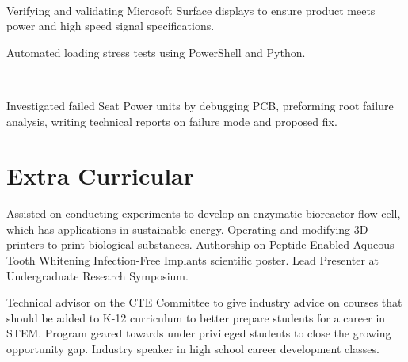 \documentclass[]{hieudo-build}
\begin{document}
\begin{minipage}[t]{0.76\textwidth}
 \\
\begin{tightemize}
\item Verifying and validating Microsoft Surface displays to ensure product meets power and high speed signal specifications.
\item Automated loading stress tests using PowerShell and Python.
\end{tightemize}
\sectionsep 

 \\
\begin{tightemize}
\item Investigated failed Seat Power units by debugging PCB, preforming root failure analysis, writing technical reports on failure mode and proposed fix.
\end{tightemize}
\sectionsep

\section{Extra Curricular}
Assisted on conducting experiments to develop an enzymatic bioreactor flow cell, which has applications in sustainable energy. Operating and modifying 3D printers to print biological substances. Authorship on Peptide-Enabled Aqueous Tooth Whitening Infection-Free Implants scientific poster. Lead Presenter at Undergraduate Research Symposium.
\sectionsep

Technical advisor on the CTE Committee to give industry advice on courses that should be added to K-12 curriculum to better prepare students for a career in STEM. Program geared towards under privileged students to close the growing opportunity gap. Industry speaker in high school career development classes. 
\sectionsep 
\end{minipage} 
\end{document}
